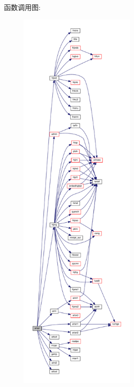 函数调用图\+:
\nopagebreak
\begin{figure}[H]
\begin{center}
\leavevmode
\includegraphics[height=550pt]{ampt_8f90_a417dc946c8fac1735981b61d5244a725_cgraph}
\end{center}
\end{figure}
